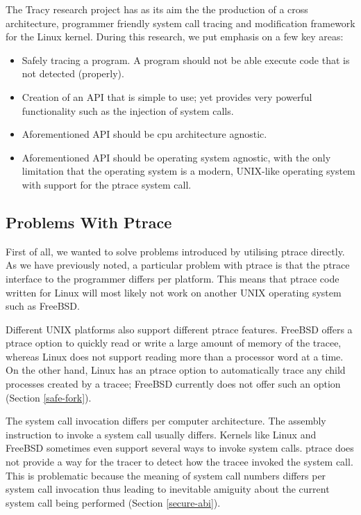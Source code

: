 \documentclass[a4paper, 10pt]{report}
\begin{document}
The Tracy research project has as its aim the the production of a cross
architecture, programmer friendly system call tracing and modification
framework for the Linux kernel.
During this research, we put emphasis on a few key areas:
\begin{itemize}
\item Safely tracing a program. A program should not be able execute code that
    is not detected (properly). %
\item Creation of an API that is simple to use; yet provides very powerful
    functionality such as the injection of system calls.
\item Aforementioned API should be cpu architecture agnostic.
\item Aforementioned API should be operating system agnostic, with the only
    limitation that the operating system is a modern, UNIX-like operating
    system with support for the ptrace system call.
\end{itemize}

\subsection{Problems With Ptrace}
First of all, we wanted to solve problems introduced by utilising ptrace
directly. As we have previously noted, a particular problem with ptrace is that
the ptrace interface to the programmer differs per platform. This means that
ptrace code written for Linux will most likely not work on another UNIX operating
system such as FreeBSD.

Different UNIX platforms also support different ptrace features. FreeBSD offers
a ptrace option to quickly read or write a large amount of memory of the
tracee, whereas Linux does not support reading more than a processor word at a
time. On the other hand, Linux has an ptrace option to automatically trace
any child processes created by a tracee; FreeBSD currently does not offer such
an option (Section \ref{safe-fork}). %

The system call invocation differs per computer architecture.
The assembly instruction to invoke a system call usually differs.
Kernels like Linux and FreeBSD sometimes even support several ways to invoke
system calls. ptrace does not provide a way for the tracer to detect how
the tracee invoked the system call. This is problematic because the meaning
of system call numbers differs per system call invocation thus leading to
inevitable amiguity about the current system call being performed (Section
\ref{secure-abi}).
\end{document}
